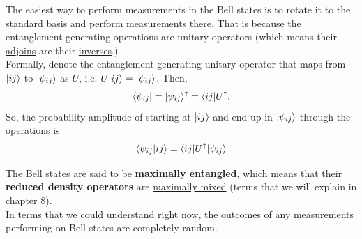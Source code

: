 \documentclass[12pt]{article}
\begin{document}
\begin{remark}
The easiest way to perform measurements in the Bell states is to rotate it to the standard basis and perform measurements there. That is because the entanglement generating operations are unitary operators (which means their \underline{adjoins} are their \underline{inverses}.)\\

\noindent Formally, denote the entanglement generating unitary operator that maps from $\Ket{ij}$ to $\Ket{\psi_{ij}}$ as $U$, i.e. $U\Ket{ij} = \Ket{\psi_{ij}}$. Then, $$
\Bra{\psi_{ij}} = \Ket{\psi_{ij}}^\dag = \Bra{ij}U^\dag.
$$ So, the probability amplitude of starting at $\Ket{ij}$ and end up in $\Ket{\psi_{ij}}$ through the operations is $$
\bk{\psi_{ij}}{ij} = \Bra{ij}U^\dag\Ket{\psi_{ij}}
$$
\end{remark}

\begin{definition}
The \underline{Bell states} are said to be \textbf{maximally entangled}, which means that their \textbf{reduced density operators} are \underline{maximally mixed} (terms that we will explain in chapter 8).\\

\noindent In terms that we could understand right now, the outcomes of any measurements performing on Bell states are completely random.
\end{definition}
\end{document}
